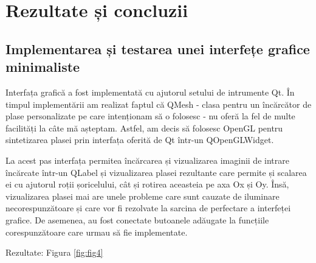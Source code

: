 \documentclass[12pt]{article}
\begin{document}

\section{Rezultate și concluzii}

\subsection{Implementarea și testarea unei interfețe grafice minimaliste}

Interfața grafică a fost implementată cu ajutorul setului de intrumente Qt. În timpul implementării am realizat faptul că QMesh - clasa pentru un încărcător de plase personalizate pe care intenționam să o folosesc - nu oferă la fel de multe facilități la câte mă așteptam. Astfel, am decis să folosesc OpenGL pentru sintetizarea plasei prin interfața oferită de Qt într-un QOpenGLWidget.

La acest pas interfața permitea încărcarea și vizualizarea imaginii de intrare încărcate într-un QLabel și vizualizarea plasei rezultante care permite și scalarea ei cu ajutorul roții șoricelului, cât și rotirea aceasteia pe axa Ox și Oy. Însă, vizualizarea plasei mai are unele probleme care  sunt cauzate de iluminare necorespunzătoare și care vor fi rezolvate la sarcina de perfectare a interfeței grafice. De asemenea, au fost conectate butoanele adăugate la funcțiile corespunzătoare care urmau să fie implementate.

Rezultate: Figura \ref{fig:fig4}
\end{document}
